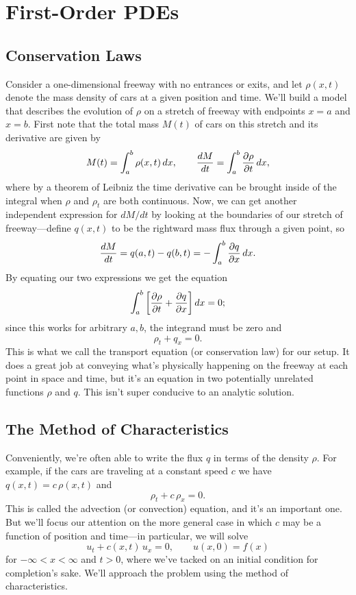 \documentclass[../m180main.tex]{subfiles}
\begin{document}
\chapter{First-Order PDEs}
\section{Conservation Laws}
Consider a one-dimensional freeway with no entrances or exits, and let $\rho(x,t)$ denote the mass density of cars at a given position and time.
We'll build a model that describes the evolution of $\rho$ on a stretch of freeway with endpoints $x=a$ and $x=b$.
First note that the total mass $M(t)$ of cars on this stretch and its derivative are given by
\[ M(t) = \int_{a}^{b} \rho(x,t) \,dx, \qquad \frac{dM}{dt} = \int_{a}^{b} \frac{\partial \rho}{\partial t} \,dx, \]
where by a theorem of Leibniz the time derivative can be brought inside of the integral when $\rho$ and $\rho_t$ are both continuous.
Now, we can get another independent expression for $dM / dt$ by looking at the boundaries of our stretch of freeway---define $q(x,t)$ to be the rightward mass flux through a given point, so
\[ \frac{dM}{dt} = q(a,t) - q(b,t) = - \int_{a}^{b} \frac{\partial q}{\partial x} \,dx. \]
By equating our two expressions we get the equation
\[ \int_{a}^{b} \left[ \frac{\partial \rho}{\partial t} + \frac{\partial q}{\partial x} \right] dx = 0; \]
since this works for arbitrary $a,b$, the integrand must be zero and
\[ \rho_t + q_x = 0. \]
This is what we call the transport equation (or conservation law) for our setup.
It does a great job at conveying what's physically happening on the freeway at each point in space and time, but it's an equation in two potentially unrelated functions $\rho$ and $q$.
This isn't super conducive to an analytic solution.

\section{The Method of Characteristics}
Conveniently, we're often able to write the flux $q$ in terms of the density $\rho$.
For example, if the cars are traveling at a constant speed $c$ we have $q(x,t) = c \,\rho(x,t)$ and
\[ \rho_t + c \,\rho_x = 0. \]
This is called the advection (or convection) equation, and it's an important one.
But we'll focus our attention on the more general case in which $c$ may be a function of position and time---in particular, we will solve
\[ u_t + c(x,t) \,u_x = 0, \qquad u(x,0) = f(x) \]
for $-\infty < x < \infty$ and $t > 0$, where we've tacked on an initial condition for completion's sake.
We'll approach the problem using the method of characteristics.
\end{document}
